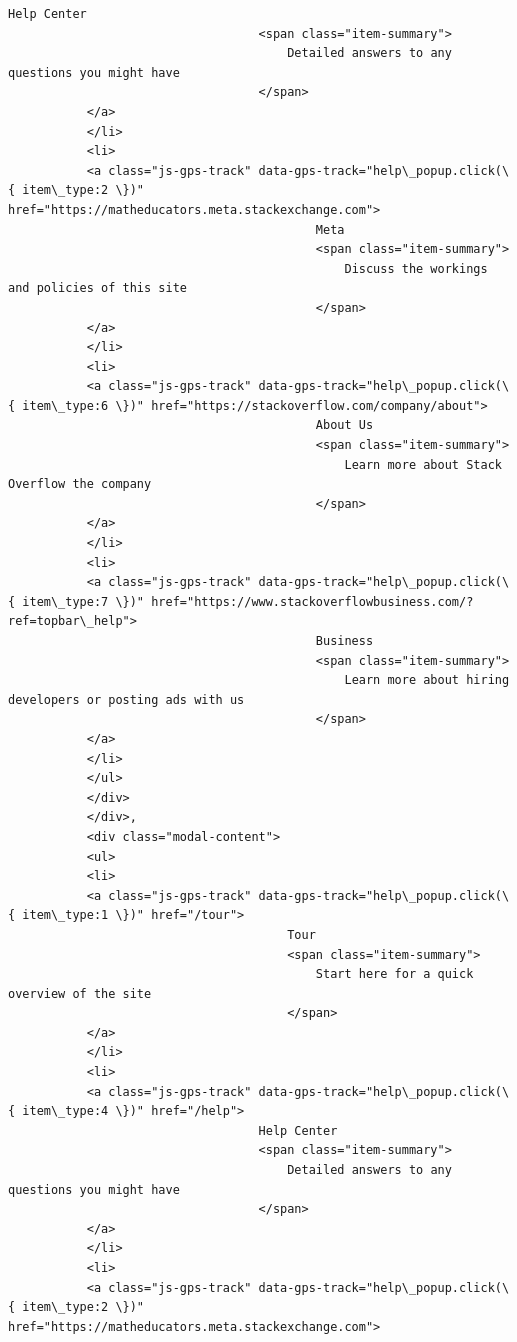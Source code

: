 \documentclass[11pt]{article}
\begin{document}
\begin{Verbatim}[commandchars=\\\{\}]
                                   Help Center
                                   <span class="item-summary">
                                       Detailed answers to any questions you might have
                                   </span>
           </a>
           </li>
           <li>
           <a class="js-gps-track" data-gps-track="help\_popup.click(\{ item\_type:2 \})" href="https://matheducators.meta.stackexchange.com">
                                           Meta
                                           <span class="item-summary">
                                               Discuss the workings and policies of this site
                                           </span>
           </a>
           </li>
           <li>
           <a class="js-gps-track" data-gps-track="help\_popup.click(\{ item\_type:6 \})" href="https://stackoverflow.com/company/about">
                                           About Us
                                           <span class="item-summary">
                                               Learn more about Stack Overflow the company
                                           </span>
           </a>
           </li>
           <li>
           <a class="js-gps-track" data-gps-track="help\_popup.click(\{ item\_type:7 \})" href="https://www.stackoverflowbusiness.com/?ref=topbar\_help">
                                           Business
                                           <span class="item-summary">
                                               Learn more about hiring developers or posting ads with us
                                           </span>
           </a>
           </li>
           </ul>
           </div>
           </div>,
           <div class="modal-content">
           <ul>
           <li>
           <a class="js-gps-track" data-gps-track="help\_popup.click(\{ item\_type:1 \})" href="/tour">
                                       Tour
                                       <span class="item-summary">
                                           Start here for a quick overview of the site
                                       </span>
           </a>
           </li>
           <li>
           <a class="js-gps-track" data-gps-track="help\_popup.click(\{ item\_type:4 \})" href="/help">
                                   Help Center
                                   <span class="item-summary">
                                       Detailed answers to any questions you might have
                                   </span>
           </a>
           </li>
           <li>
           <a class="js-gps-track" data-gps-track="help\_popup.click(\{ item\_type:2 \})" href="https://matheducators.meta.stackexchange.com">

\end{Verbatim}
\end{document}
